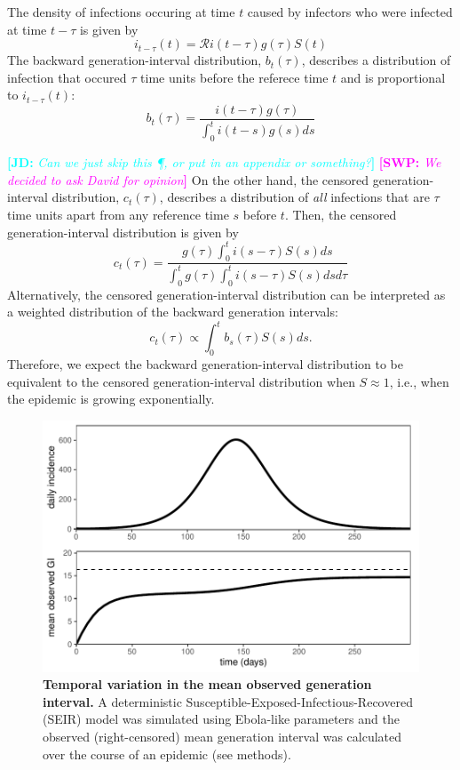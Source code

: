 \documentclass[12pt]{article}
\newcommand{\RR}{\ensuremath{{\mathcal R}}}
\newcommand{\comment}[3]{\textcolor{#1}{\textbf{[#2: }\textsl{#3}\textbf{]}}}
\newcommand{\jd}[1]{\comment{cyan}{JD}{#1}}
\newcommand{\swp}[1]{\comment{magenta}{SWP}{#1}}
\begin{document}
The density of infections occuring at time $t$ caused by infectors who were infected at time $t-\tau$ is given by
\begin{equation}
i_{t-\tau}(t) = \RR i(t-\tau) g(\tau) S(t)
\end{equation}
The backward generation-interval distribution, $b_t(\tau)$, describes a distribution of infection that occured $\tau$ time units before the referece time $t$ and is proportional to $i_{t-\tau}(t)$:
\begin{equation}
b_t(\tau) = \frac{i(t-\tau) g(\tau)}{\int_0^t i(t-s) g(s) ds}
\end{equation}

\jd{Can we just skip this \P, or put in an appendix or something?}
\swp{We decided to ask David for opinion}
On the other hand, the censored generation-interval distribution, $c_t(\tau)$, describes a distribution of \emph{all} infections that are $\tau$ time units apart from any reference time $s$ before $t$.
Then, the censored generation-interval distribution is given by
\begin{equation}\label{eq:obsg}
c_t(\tau) = \frac{g(\tau) \int_0^t i(s-\tau) S(s) ds}{\int_0^t g(\tau) \int_0^t i(s-\tau) S(s) ds d\tau}
\end{equation}
Alternatively, the censored generation-interval distribution can be interpreted as a weighted distribution of the backward generation intervals:
\begin{equation}
c_t(\tau) \propto \int_0^t b_s(\tau) S(s) ds.
\end{equation}
Therefore, we expect the backward generation-interval distribution to be equivalent to the censored generation-interval distribution when $S \approx 1$, i.e., when the epidemic is growing exponentially.

\begin{figure}[t]
\includegraphics[width=\textwidth]{../fig/temporal_effect.pdf}
\caption{\textbf{Temporal variation in the mean observed generation interval.}
A deterministic Susceptible-Exposed-Infectious-Recovered (SEIR) model was simulated using Ebola-like parameters and the observed (right-censored) mean generation interval was calculated over the course of an epidemic (see methods).
}
\label{fig:censor}
\end{figure}
\end{document}
